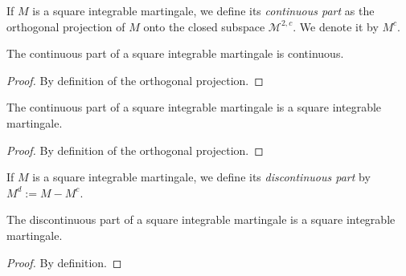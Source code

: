 \begin{definition}\label{def:continuousPartSquareIntegrable}
  \leanok
If $M$ is a square integrable martingale, we define its \emph{continuous part} as the orthogonal projection of $M$ onto the closed subspace $\mathcal{M}^{2,c}$. We denote it by $M^c$.
\end{definition}


\begin{lemma}\label{lem:continuous_continuousPart}
  \leanok
The continuous part of a square integrable martingale is continuous.
\end{lemma}

\begin{proof}
  \leanok
By definition of the orthogonal projection.
\end{proof}


\begin{lemma}\label{lem:isSquareIntegrable_continuousPart}
  \leanok
The continuous part of a square integrable martingale is a square integrable martingale.
\end{lemma}

\begin{proof}
  \leanok
By definition of the orthogonal projection.
\end{proof}


\begin{definition}\label{def:discontinuousPart}
  \leanok
If $M$ is a square integrable martingale, we define its \emph{discontinuous part} by $M^d := M - M^c$.
\end{definition}


\begin{lemma}\label{lem:isSquareIntegrable_discontinuousPart}
  \leanok
The discontinuous part of a square integrable martingale is a square integrable martingale.
\end{lemma}

\begin{proof}
  \leanok
By definition.
\end{proof}


